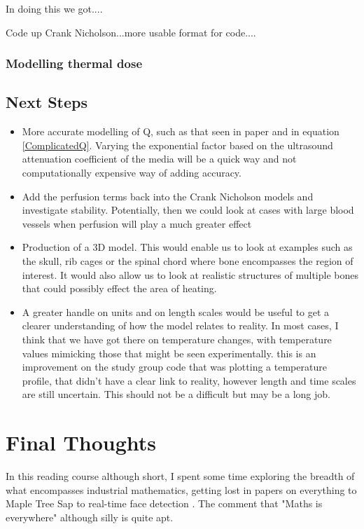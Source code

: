 \documentclass[11pt]{article} %
\begin{document}
  



In doing this we got....


Code up Crank Nicholson...more usable format for code....


\subsubsection{Modelling thermal dose}
\subsection{Next Steps}
\begin{itemize}
	\item More accurate modelling of Q, such as that seen in paper \cite{Scott2014} and in equation \ref{ComplicatedQ}. Varying the exponential factor based on the ultrasound attenuation coefficient of the media will be a quick way and not computationally expensive way of adding accuracy. 
	\item Add the perfusion terms back into the Crank Nicholson models and investigate stability. Potentially, then we could look at cases with large blood vessels when perfusion will play a much greater effect
	
	\item Production of a  3D model. This would enable us  to look at examples such as the skull, rib cages or the spinal chord where bone encompasses the region of interest. It would also allow us to look at realistic structures of multiple bones that could possibly effect the area of heating. 
	\item A greater handle on units and on length scales would be useful to get a clearer understanding of how the model relates to reality. In most cases, I think that we have got there on temperature changes, with temperature values mimicking those that might be seen experimentally. this is an improvement on the study group code that was plotting a temperature profile, that didn't have a clear link to reality,  however length and time scales are still uncertain. This should not be a difficult but may be a long job.
\end{itemize}

  
	\section{Final Thoughts} 
In this reading course although short, I spent some time exploring the breadth of what encompasses industrial mathematics, getting lost in papers on everything to Maple Tree Sap \cite{Stockie2015} to real-time face detection \cite{Viola2004}. The comment that "Maths is everywhere" although silly is quite apt. 
\end{document}
